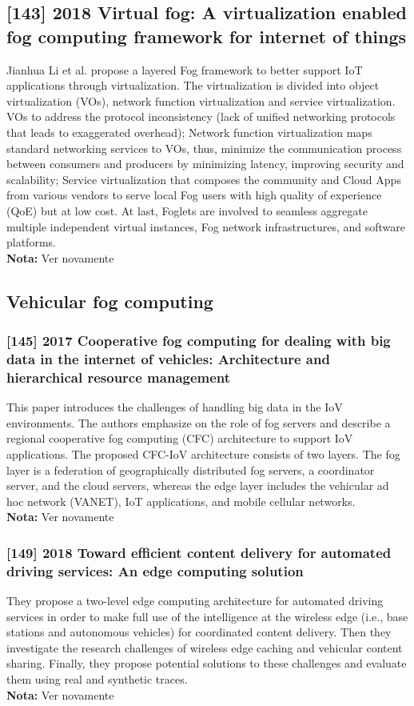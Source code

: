 \subsection{[143] 2018 Virtual fog: A virtualization enabled fog computing framework for internet of things}
\label{subsec:paper04}
Jianhua Li et al. \cite{li2018virtual} propose a layered Fog framework to better support IoT applications through virtualization. The virtualization is divided into object virtualization (VOs), network function virtualization and service virtualization. VOs to address the protocol inconsistency (lack of unified networking protocols that leads to exaggerated overhead); Network function virtualization maps standard networking services to VOs, thus, minimize the communication process between consumers and producers by minimizing latency, improving security and scalability; Service virtualization that composes the community and Cloud Apps from various vendors to serve local Fog users with high quality of experience (QoE) but at low cost. At last, Foglets are involved to seamless aggregate multiple independent virtual instances, Fog network infrastructures, and software platforms.\\
\textbf{Nota:} Ver novamente

\subsection{Vehicular fog computing}
\subsubsection{[145] 2017 Cooperative fog computing for dealing with big data in the internet of vehicles: Architecture and hierarchical resource management}
This paper introduces the challenges of handling big data in the IoV environments. The authors emphasize on the role of fog servers and describe a regional cooperative fog computing (CFC) architecture to support IoV applications. The proposed CFC-IoV architecture consists of two layers. The fog layer is a federation of geographically distributed fog servers, a coordinator server, and the cloud servers, whereas the edge layer includes the vehicular ad hoc network (VANET), IoT applications, and mobile cellular networks.\\
\textbf{Nota:} Ver novamente

\subsubsection{[149] 2018 Toward efficient content delivery for automated driving services: An edge computing solution}
They propose a two-level edge computing architecture for automated driving services in order to make full use of the intelligence at the wireless edge (i.e., base stations and autonomous vehicles) for coordinated content delivery. Then they investigate the research challenges of wireless edge caching and vehicular content sharing. Finally, they propose potential solutions to these challenges and evaluate them using real and synthetic traces.\\
\textbf{Nota:} Ver novamente

